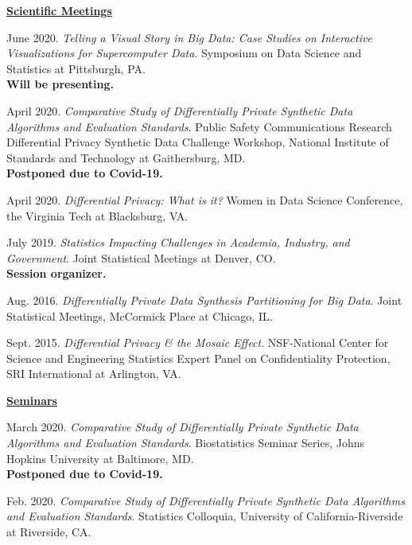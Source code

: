 \documentclass[11pt, letterpaper, roman]{moderncv} %
\begin{document}
\underline{\textbf{\large Scientific Meetings}}\normalsize
\vspace{6pt}
\begin{etaremune}[topsep=0pt, itemsep=6pt, partopsep=0pt, parsep=0pt]
  \item June 2020. \textit{Telling a Visual Story in Big Data: Case Studies on Interactive Visualizations for Supercomputer Data}. Symposium on Data Science and Statistics at Pittsburgh, PA.\\
  \textbf{Will be presenting.}
  
    \item April 2020. \textit{Comparative Study of Differentially Private Synthetic Data Algorithms and Evaluation Standards}. Public Safety Communications Research Differential Privacy Synthetic Data Challenge Workshop, National Institute of Standards and Technology at Gaithersburg, MD.\\
  \textbf{Postponed due to Covid-19.}
  
    \item April 2020. \textit{Differential Privacy: What is it?} Women in Data Science Conference, the Virginia Tech at Blacksburg, VA.

  \item July 2019. \textit{Statistics Impacting Challenges in Academia, Industry, and Government}. Joint Statistical Meetings at Denver, CO.\\
  \textbf{Session organizer.}

  \item Aug. 2016. \textit{Differentially Private Data Synthesis Partitioning for Big Data}. Joint Statistical Meetings, McCormick Place at Chicago, IL.

  \item Sept. 2015. \textit{Differential Privacy \& the Mosaic Effect}. NSF-National Center for Science and Engineering Statistics Expert Panel on Confidentiality Protection, SRI International at Arlington, VA.

\vspace{5pt}
\hspace{-0.30in}\underline{\textbf{\large Seminars}}\normalsize
  \item March 2020. \textit{Comparative Study of Differentially Private Synthetic Data Algorithms and Evaluation Standards}. Biostatistics Seminar Series, Johns Hopkins University at Baltimore, MD.\\
  \textbf{Postponed due to Covid-19.}
  
  \item Feb. 2020. \textit{Comparative Study of Differentially Private Synthetic Data Algorithms and Evaluation Standards}. Statistics Colloquia, University of California-Riverside at Riverside, CA.
  

\end{etaremune}
\end{document}
